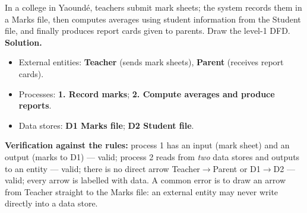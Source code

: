 \documentclass[11pt]{article}
\newcommand{\legende}[1]{\par\vspace{6pt}{\popsemi\fontsize{9}{11.5}\selectfont\color{popmuted}#1}}
\begin{document}
\begin{exoresolu}
In a college in Yaoundé, teachers submit mark sheets; the system records them in a Marks file, then computes averages using student information from the Student file, and finally produces report cards given to parents. Draw the level-1 DFD.
\tcblower
\textbf{Solution.}
\begin{itemize}
\item External entities: \textbf{Teacher} (sends mark sheets), \textbf{Parent} (receives report cards).
\item Processes: \textbf{1. Record marks}; \textbf{2. Compute averages and produce reports}.
\item Data stores: \textbf{D1 Marks file}; \textbf{D2 Student file}.
\end{itemize}

\begin{popfigure}
\begin{center}
\end{center}
\legende{Level-1 DFD of the report-card system.}
\end{popfigure}

\textbf{Verification against the rules:} process 1 has an input (mark sheet) and an output (marks to D1) — valid; process 2 reads from \emph{two} data stores and outputs to an entity — valid; there is no direct arrow Teacher$\to$Parent or D1$\to$D2 — valid; every arrow is labelled with data. A common error is to draw an arrow from Teacher straight to the Marks file: an external entity may never write directly into a data store.
\end{exoresolu}
\end{document}

